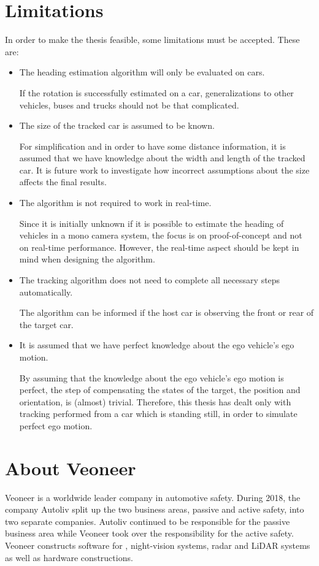 \section{Limitations}
In order to make the thesis feasible, some limitations must be accepted. These are:

\begin{itemize}	
	\item The heading estimation algorithm will only be evaluated on cars.

	If the rotation is successfully estimated on a car, generalizations to other vehicles, \eg buses and trucks should not be that complicated.

	\item The size of the tracked car is assumed to be known.

	For simplification and in order to have some  distance information, it is assumed that we have knowledge about the width and length of the tracked car.
	It is future work to investigate how incorrect assumptions about the size affects the final results.

	\item The algorithm is not required to work in real-time.

	Since it is initially unknown if it is possible to estimate the heading of vehicles in a mono camera system, the focus is on proof-of-concept and not on real-time performance.
	However, the real-time aspect should be kept in mind when designing the algorithm.

    \item The tracking algorithm does not need to complete all necessary steps automatically.

    The algorithm can \eg be informed if the host car is observing the front or rear of the target car.

	\item It is assumed that we have perfect knowledge about the ego vehicle's ego motion.

	By assuming that the knowledge about the ego vehicle's ego motion is perfect, the step of compensating the states of the target, \ie the position and orientation, is (almost) trivial.
	Therefore, this thesis has dealt only with tracking performed from a car which is standing still, in order to simulate perfect ego motion.
\end{itemize}

\newpage

\section{About Veoneer}
Veoneer is a worldwide leader company in automotive safety.
During 2018, the company Autoliv split up the two business areas, passive and active safety, into two separate companies.
Autoliv continued to be responsible for the passive business area while Veoneer took over the responsibility for the active safety.
Veoneer constructs software for \abbrADAS, night-vision systems, radar and LiDAR systems as well as hardware constructions.
\cite{Veoneer:2018}

